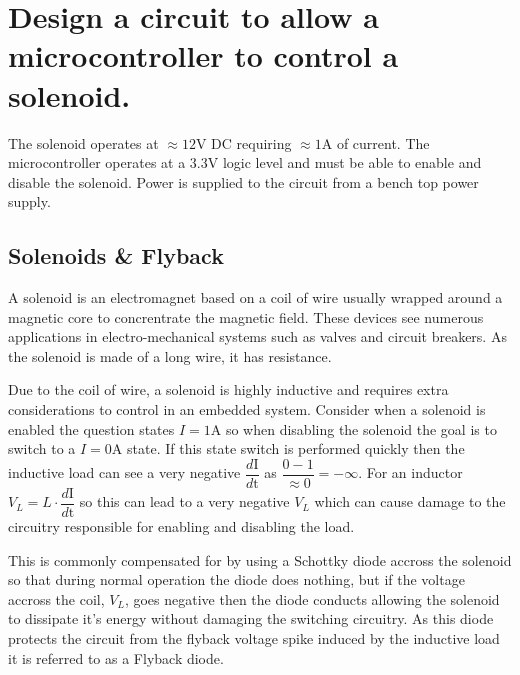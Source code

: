 \documentclass[main.tex]{subfiles}
\begin{document}
\section{Design a circuit to allow a microcontroller to control a solenoid.} \label{section:switching}

The solenoid operates at $\approx 12\text{V}$ DC requiring $\approx 1\text{A}$ of current. The microcontroller operates at a $3.3\text{V}$ logic level and must be able to enable and disable the solenoid. Power is supplied to the circuit from a bench top power supply. 

\spoilerline

\subsection{Solenoids \& Flyback}
A solenoid is an electromagnet based on a coil of wire usually wrapped around a magnetic core to concrentrate the magnetic field. These devices see numerous applications in electro-mechanical systems such as valves and circuit breakers. As the solenoid is made of a long wire, it has resistance. \newline

\newnoindentpara Due to the coil of wire, a solenoid is highly inductive and requires extra considerations to control in an embedded system. Consider when a solenoid is enabled the question states $I = 1\text{A}$ so when disabling the solenoid the goal is to switch to a $I = 0 \text{A}$ state. If this state switch is performed quickly then the inductive load can see a very negative $\dfrac{d\text{I}}{d\text{t}}$ as $\dfrac{0 - 1}{\approx 0} = - \infty$. For an inductor $V_L = L \cdot \dfrac{d\text{I}}{d\text{t}}$ so this can lead to a very negative $V_L$ which can cause damage to the circuitry responsible for enabling and disabling the load. \newline

\newnoindentpara This is commonly compensated for by using a Schottky diode accross the solenoid so that during normal operation the diode does nothing, but if the voltage accross the coil, $V_L$, goes negative then the diode conducts allowing the solenoid to dissipate it's energy without damaging the switching circuitry. As this diode protects the circuit from the flyback voltage spike induced by the inductive load it is referred to as a Flyback diode. 
\end{document}
